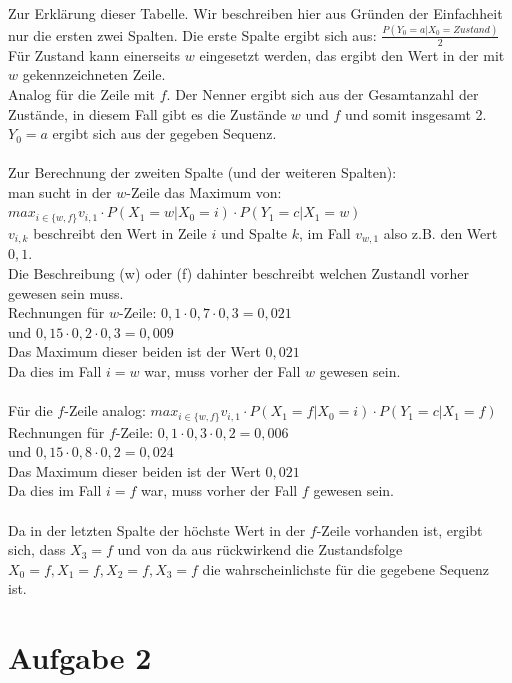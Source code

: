 \documentclass[a4paper]{article}
\begin{document}
Zur Erkl\"arung dieser Tabelle.
Wir beschreiben hier aus Gr\"unden der Einfachheit nur die ersten zwei Spalten.
Die erste Spalte ergibt sich aus: $\frac{P(Y_0=a|X_0=Zustand)}{2}$
F\"ur Zustand kann einerseits $w$ eingesetzt werden, das ergibt den Wert in der mit $w$ gekennzeichneten Zeile. \\
Analog f\"ur die Zeile mit $f$. Der Nenner ergibt sich aus der Gesamtanzahl der Zust\"ande, in diesem Fall gibt es die Zust\"ande $w$ und $f$ und somit insgesamt 2. \\
$Y_0=a$ ergibt sich aus der gegeben Sequenz.\\
\\
Zur Berechnung der zweiten Spalte (und der weiteren Spalten): \\
man sucht in der $w$-Zeile das Maximum von: $max_{i \in \{w,f\}} v_{i,1} \cdot P(X_1=w | X_0= i) \cdot P(Y_1=c | X_1 = w)$ \\
$v_{i,k}$ beschreibt den Wert in Zeile $i$ und Spalte $k$, im Fall $v_{w,1}$ also z.B. den Wert $0,1$. \\
Die Beschreibung (w) oder (f) dahinter beschreibt welchen Zustandl vorher gewesen sein muss. 
\\
Rechnungen f\"ur $w$-Zeile: $0,1 \cdot 0,7 \cdot 0,3 = 0,021$  \\
und $0,15 \cdot 0,2 \cdot 0,3 = 0,009$ \\
Das Maximum dieser beiden ist der Wert $0,021$ \\
Da dies im Fall $i = w$ war, muss vorher der Fall $w$ gewesen sein. \\
\\
F\"ur die $f$-Zeile analog: $max_{i \in \{w,f\}} v_{i,1} \cdot P(X_1=f | X_0= i) \cdot P(Y_1=c | X_1 = f)$ \\
Rechnungen f\"ur $f$-Zeile: $0,1 \cdot 0,3 \cdot 0,2 = 0,006$  \\
und $0,15 \cdot 0,8 \cdot 0,2 = 0,024$ \\
Das Maximum dieser beiden ist der Wert $0,021$ \\
Da dies im Fall $i = f$ war, muss vorher der Fall $f$ gewesen sein. \\
\\
Da in der letzten Spalte der h\"ochste Wert in der $f$-Zeile vorhanden ist, ergibt sich, dass $X_3 = f$ und von da aus r\"uckwirkend die Zustandsfolge $X_0 = f, X_1=f, X_2=f, X_3=f$ die wahrscheinlichste für die gegebene Sequenz ist.

\section*{Aufgabe 2}
\end{document}
